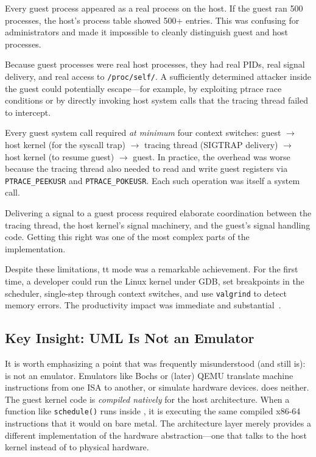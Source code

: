 \begin{description}[leftmargin=2em,labelindent=1em]
  \item[Host visibility] Every guest process appeared as a real process on the
    host.  If the guest ran 500 processes, the host's process table showed 500+
    entries.  This was confusing for administrators and made it impossible to
    cleanly distinguish guest and host processes.

  \item[Security] Because guest processes were real host processes, they had
    real PIDs, real signal delivery, and real access to \texttt{/proc/self/}.
    A sufficiently determined attacker inside the guest could potentially
    escape---for example, by exploiting ptrace race conditions or by directly
    invoking host system calls that the tracing thread failed to intercept.

  \item[Performance] Every guest system call required \emph{at minimum} four
    context switches: guest $\to$ host kernel (for the syscall trap) $\to$
    tracing thread (SIGTRAP delivery) $\to$ host kernel (to resume guest) $\to$
    guest.  In practice, the overhead was worse because the tracing thread also
    needed to read and write guest registers via \texttt{PTRACE\_PEEKUSR} and
    \texttt{PTRACE\_POKEUSR}.  Each such operation was itself a system call.

  \item[Signal handling] Delivering a signal to a guest process required
    elaborate coordination between the tracing thread, the host kernel's signal
    machinery, and the guest's signal handling code.  Getting this right was one
    of the most complex parts of the implementation.
\end{description}

\noindent
Despite these limitations, tt mode was a remarkable achievement.  For the first
time, a developer could run the Linux kernel under GDB, set breakpoints in the
scheduler, single-step through context switches, and use \texttt{valgrind} to
detect memory errors.  The productivity impact was immediate and
substantial~\cite{dike2001}.

\subsection{Key Insight: UML Is Not an Emulator}
\label{sec:history-not-emulator}

It is worth emphasizing a point that was frequently misunderstood (and still
is): \UML{} is not an emulator.  Emulators like Bochs or (later) QEMU translate
machine instructions from one ISA to another, or simulate hardware devices.
\UML{} does neither.  The guest kernel code is \emph{compiled natively} for the
host architecture.  When a function like \texttt{schedule()} runs inside \UML{},
it is executing the same compiled x86-64 instructions that it would on bare
metal.  The architecture layer merely provides a different implementation of the
hardware abstraction---one that talks to the host kernel instead of to physical
hardware.


